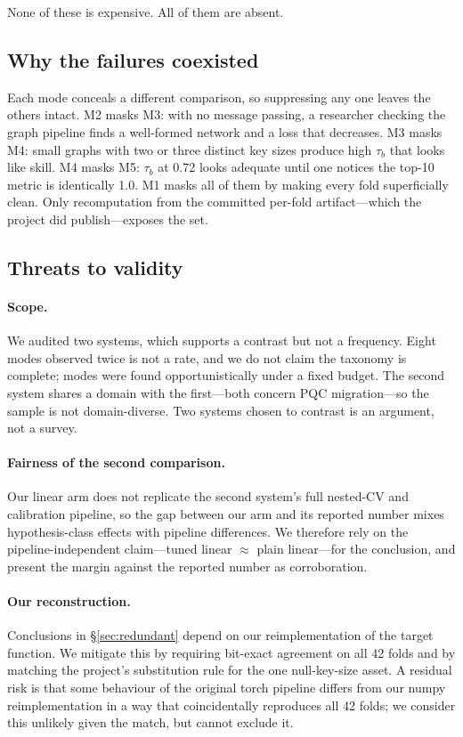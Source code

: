 \documentclass[conference]{IEEEtran}
\begin{document}
None of these is expensive. All of them are absent.

\subsection{Why the failures coexisted}

Each mode conceals a different comparison, so suppressing any one leaves the others
intact. M2 masks M3: with no message passing, a researcher checking the graph pipeline
finds a well-formed network and a loss that decreases. M3 masks M4: small graphs with
two or three distinct key sizes produce high $\tau_b$ that looks like skill. M4 masks M5:
$\tau_b$ at 0.72 looks adequate until one notices the top-10 metric is identically 1.0.
M1 masks all of them by making every fold superficially clean. Only recomputation from
the committed per-fold artifact---which the project did publish---exposes the set.

\subsection{Threats to validity}

\paragraph{Scope.} We audited two systems, which supports a contrast but not a frequency.
Eight modes observed twice is not a rate, and we do not claim the taxonomy is complete;
modes were found opportunistically under a fixed budget. The second system shares a domain
with the first---both concern PQC migration---so the sample is not domain-diverse. Two
systems chosen to contrast is an argument, not a survey.

\paragraph{Fairness of the second comparison.} Our linear arm does not replicate the second
system's full nested-CV and calibration pipeline, so the gap between our arm and its
reported number mixes hypothesis-class effects with pipeline differences. We therefore rely
on the pipeline-independent claim---tuned linear $\approx$ plain linear---for the
conclusion, and present the margin against the reported number as corroboration.

\paragraph{Our reconstruction.} Conclusions in \S\ref{sec:redundant} depend on our
reimplementation of the target function. We mitigate this by requiring bit-exact
agreement on all 42 folds and by matching the project's substitution rule for the one
null-key-size asset. A residual risk is that some behaviour of the original torch pipeline
differs from our numpy reimplementation in a way that coincidentally reproduces all 42
folds; we consider this unlikely given the match, but cannot exclude it.
\end{document}
